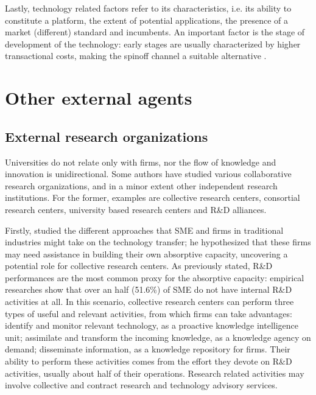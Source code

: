 Lastly, technology related factors refer to its characteristics, i.e. its ability to constitute a platform, the extent of potential applications, the presence of a market (different) standard and incumbents. An important factor is the stage of development of the technology: early stages are usually characterized by higher transactional costs, making the spinoff channel a suitable alternative \citep{Rizzo2015}. 

\section{Other external agents}

\subsection{External research organizations}

Universities do not relate only with firms, nor the flow of knowledge and innovation is unidirectional. Some authors have studied various collaborative research organizations, and in a minor extent other independent research institutions. For the former, examples are collective research centers, consortial research centers, university based research centers and R\&D alliances. 

Firstly, \citet{Spithoven2011} studied the different approaches that SME and firms in traditional industries might take on the technology transfer; he hypothesized that these firms may need assistance in building their own absorptive capacity, uncovering a potential role for collective research centers. As previously stated, R\&D performances are the most common proxy for the absorptive capacity: empirical researches show that over an half (51.6\%) of SME do not have internal R\&D activities at all. In this scenario, collective research centers can perform three types of useful and relevant activities, from which firms can take advantages: identify and monitor relevant technology, as a proactive knowledge intelligence unit; assimilate and transform the incoming knowledge, as a knowledge agency on demand; disseminate information, as a knowledge repository for firms. Their ability to perform these activities comes from the effort they devote on R\&D activities, usually about half of their operations. Research related activities may involve collective and contract research and technology advisory services.

